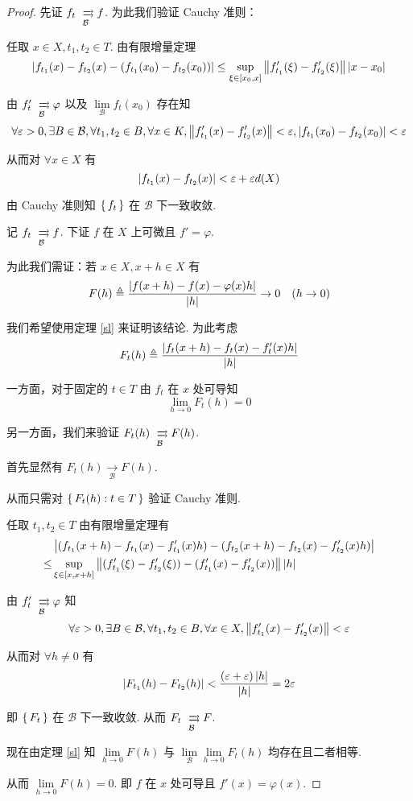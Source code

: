 \begin{proof}
    先证 $f_t\xrightrightarrows[\mathcal{B}]{}f$. 为此我们验证 Cauchy 准则：

    任取 $x\in X,t_1,t_2\in T$. 由有限增量定理
$$
\left\lvert{f_{t_1}(x)-f_{t_2}(x)-(f_{t_1}(x_0)-f_{t_2}(x_0))}\right\rvert\le\sup_{\xi\in[x_0,x]}\left\lVert{f_{t_1}'(\xi)-f_{t_2}'(\xi)}\right\rVert\left\lvert{x-x_0}\right\rvert
$$

    由 $f_t'\xrightrightarrows[\mathcal{B}]{}\varphi$ 以及 $\lim\limits_{\mathcal{B}}f_t(x_0)$ 存在知
$$
\forall\varepsilon>0,\exists B\in\mathcal{B},\forall t_1,t_2\in B,\forall x\in K,\left\lVert{f_{t_1}'(x)-f_{t_2}'(x)}\right\rVert<\varepsilon,\left\lvert{f_{t_1}(x_0)-f_{t_2}(x_0)}\right\rvert<\varepsilon
$$

    从而对 $\forall x\in X$ 有
$$
\left\lvert{f_{t_1}(x)-f_{t_2}(x)}\right\rvert<\varepsilon+\varepsilon d(X)
$$

    由 Cauchy 准则知 $\set{f_t}$ 在 $\mathcal{B}$ 下一致收敛.

    记 $f_t\xrightrightarrows[\mathcal{B}]{}f$. 下证 $f$ 在 $X$ 上可微且 $f'=\varphi$.

    为此我们需证：若 $x\in X,x+h\in X$ 有
$$
F(h)\triangleq\frac{\left\lvert{f(x+h)-f(x)-\varphi(x)h}\right\rvert}{\left\lvert{h}\right\rvert}\to 0\quad(h\to 0)
$$

    我们希望使用定理 \ref{sl} 来证明该结论. 为此考虑
$$
F_t(h)\triangleq\frac{\left\lvert{f_t(x+h)-f_t(x)-f_t'(x)h}\right\rvert}{\left\lvert{h}\right\rvert}
$$

    一方面，对于固定的 $t\in T$ 由 $f_t$ 在 $x$ 处可导知
$$
\lim_{h\to 0}F_t(h)=0
$$

    另一方面，我们来验证 $F_t(h)\xrightrightarrows[\mathcal{B}]{}F(h)$.

    首先显然有 $F_t(h)\xrightarrow[\mathcal{B}]{}F(h)$.

    从而只需对 $\set{F_t(h):t\in T}$ 验证 Cauchy 准则.

    任取 $t_1,t_2\in T$ 由有限增量定理有
$$
\begin{aligned}
    &\left\lvert{(f_{t_1}(x+h)-f_{t_1}(x)-f_{t_1}'(x)h)-(f_{t_2}(x+h)-f_{t_2}(x)-f_{t_2}'(x)h)}\right\rvert\\
    \le&\sup_{\xi\in[x,x+h]}\left\lVert{(f_{t_1}'(\xi)-f_{t_2}'(\xi))-(f_{t_1}'(x)-f_{t_2}'(x))}\right\rVert\left\lvert{h}\right\rvert
\end{aligned}
$$

    由 $f_t'\xrightrightarrows[\mathcal{B}]{}\varphi$ 知
$$
\forall\varepsilon>0,\exists B\in\mathcal{B},\forall t_1,t_2\in B,\forall x\in X,\left\lVert{f_{t_1}'(x)-f_{t_2}'(x)}\right\rVert<\varepsilon
$$

    从而对 $\forall h\ne 0$ 有
$$
\left\lvert{F_{t_1}(h)-F_{t_2}(h)}\right\rvert<\frac{(\varepsilon+\varepsilon)\left\lvert{h}\right\rvert}{\left\lvert{h}\right\rvert}=2\varepsilon
$$

    即 $\set{F_t}$ 在 $\mathcal{B}$ 下一致收敛. 从而 $F_t\xrightrightarrows[\mathcal{B}]{}F$.

    现在由定理 \ref{sl} 知 $\lim\limits_{h\to 0}F(h)$ 与 $\lim\limits_{\mathcal{B}}\lim\limits_{h\to 0}F_t(h)$ 均存在且二者相等.

    从而 $\lim\limits_{h\to 0}F(h)=0$. 即 $f$ 在 $x$ 处可导且 $f'(x)=\varphi(x)$.
\end{proof}

